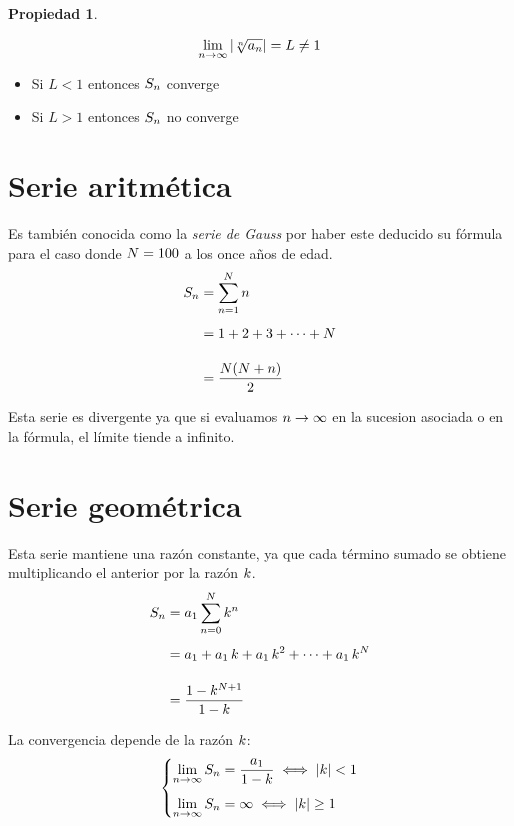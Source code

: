 \documentclass[a5paper,12pt,twoside]{book}
\newtheorem{prop}{{Propiedad}}[chapter]
\begin{document}
\begin{mdframed}[style=PropertyFrame]
    \begin{prop}
        \label{prop:CauchyCriterion}
    \end{prop}
    \begin{equation*}
        \lim_{n\to\infty} {\left| {\sqrt[n]{a_n}} \right|} = L \neq 1
    \end{equation*}
    \begin{itemize}
        \item Si $L<1$ entonces $S_n$ converge
        \item Si $L>1$ entonces $S_n$ no converge
    \end{itemize}
\end{mdframed}


\section{Serie aritmética}

Es también conocida como la \emph{serie de Gauss} por haber este deducido su fórmula para el caso donde $N=100$ a los once años de edad.
\begin{align*}
    S_n &= \sum_{n=1}^N n
    \\[1ex]
    &= 1 + 2 + 3 + \dots + N
    \\[1em]
    &= \frac{N(N+n)}{2}
\end{align*}

Esta serie es divergente ya que si evaluamos $n\to\infty$ en la sucesion asociada o en la fórmula, el límite tiende a infinito.


\section{Serie geométrica}

Esta serie mantiene una razón constante, ya que cada término sumado se obtiene multiplicando el anterior por la razón $k$.
\begin{align*}
    S_n &= a_1 \sum_{n=0}^N k^n
    \\[1ex]
    &= a_1 + a_1 \, k + a_1 \, k^2 + \dots + a_1 \, k^N
    \\[1em]
    &= \frac{1-k^{N+1}}{1-k}
\end{align*}

La convergencia depende de la razón $k$:
\begin{equation*}
    \left\{
    \begin{aligned}
        \lim_{n\to\infty} S_n &= \frac{a_1}{1-k} \iff {\left| {k} \right|} < 1
        \\[1ex]
        \lim_{n\to\infty} S_n &= \infty \iff {\left| {k} \right|} \geq 1
    \end{aligned}
    \right.
\end{equation*}
\end{document}
